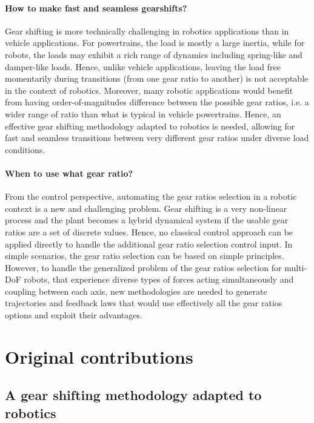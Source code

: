 \paragraph{How to make fast and seamless gearshifts?}
Gear shifting is more technically challenging in robotics applications than in vehicle applications. For powertrains, the load is mostly a large inertia, while for robots, the loads may exhibit a rich range of dynamics including spring-like and damper-like loads. Hence, unlike vehicle applications, leaving the load free momentarily during transitions (from one gear ratio to another) is not acceptable in the context of robotics. Moreover, many robotic applications would benefit from having order-of-magnitudes difference between the possible gear ratios, i.e. a wider range of ratio than what is typical in vehicle powertrains. Hence, an effective gear shifting methodology adapted to robotics is needed, allowing for fast and seamless transitions between very different gear ratios under diverse load conditions.

\paragraph{When to use what gear ratio?}
From the control perspective, automating the gear ratios selection in a robotic context is a new and challenging problem. Gear shifting is a very non-linear process and the plant becomes a hybrid dynamical system if the usable gear ratios are a set of discrete values. Hence, no classical control approach can be applied directly to handle the additional gear ratio selection control input. In simple scenarios, the gear ratio selection can be based on simple principles. However, to handle the generalized problem of the gear ratios selection for multi-DoF robots, that experience diverse types of forces acting simultaneously and coupling between each axis, new methodologies are needed to generate trajectories and feedback laws that would use effectively all the gear ratios options and exploit their advantages.


\newpage

\section{Original contributions}
\label{sec:contribution}

\subsection{A gear shifting methodology adapted to robotics}

